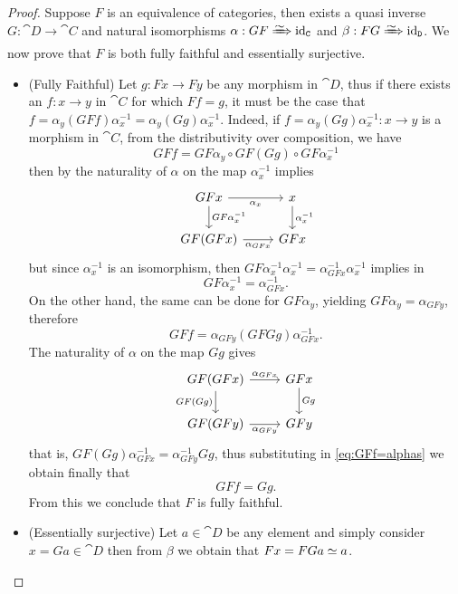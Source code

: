 \begin{proof}
Suppose \(F\) is an equivalence of categories, then exists a quasi inverse
\(G: \cat D \to \cat C\) and natural isomorphisms
\(\alpha: G F \isonat \Id_{\cat C}\) and \(\beta: F G \isonat \Id_{\cat D}\). We
now prove that \(F\) is both fully faithful and essentially surjective.

\begin{itemize}\setlength\itemsep{0em}
\item (Fully Faithful) Let \(g: Fx \to Fy\) be any morphism in \(\cat D\), thus
  if there exists an \(f: x \to y\) in \(\cat C\) for which \(F f = g\), it must
  be the case that
  \(f = \alpha_y (G F f) \alpha_x^{-1} = \alpha_y (G g) \alpha_x^{-1}\). Indeed,
  if \(f = \alpha_y (G g) \alpha_x^{-1}: x \to y\) is a morphism in \(\cat C\),
  from the distributivity over composition, we have
  \[
  G F f = G F \alpha_y \circ G F (G g) \circ G F \alpha_x^{-1}
  \]
  then by the naturality of \(\alpha\) on the map \(\alpha_x^{-1}\) implies
  \[
  \begin{tikzcd}
  G F x \ar[d, "G F \alpha_x^{-1}"] \ar[r, "\alpha_x"']
  & x \ar[d, "\alpha_x^{-1}"] \\
  G F (G F x) \ar[r, "\alpha_{G F x}"'] & G F x
  \end{tikzcd}
  \]
  but since \(\alpha_x^{-1}\) is an isomorphism, then
  \(G F \alpha_x^{-1} \alpha_x^{-1} = \alpha_{G F x}^{-1} \alpha_x^{-1}\)
  implies in
  \[
  G F \alpha_x^{-1} = \alpha_{G F x}^{-1}.
  \]
  On the other hand, the same can be done for \(G F \alpha_y\), yielding
  \(G F \alpha_y = \alpha_{G F y}\), therefore
  \begin{equation}\label{eq:GFf=alphas}
  G F f = \alpha_{G F y} (G F G g) \alpha_{G F x}^{-1}.
  \end{equation}
  The naturality of \(\alpha\) on the map \(G g\) gives
  \[
  \begin{tikzcd}
  G F (G F x) \ar[r, "\alpha_{G F x}"] \ar[d, "G F (G g)"']
  & G F x \ar[d, "G g"] \\
  G F (G F y) \ar[r, "\alpha_{G F y}"'] & G F y
  \end{tikzcd}
  \]
  that is, \(G F (G g) \alpha_{G F x}^{-1} = \alpha_{G F y}^{-1} G g\), thus
  substituting in \cref{eq:GFf=alphas} we obtain finally that
  \[
  G F f = G g.
  \]
  From this we conclude that \(F\) is fully faithful.

\item (Essentially surjective) Let \(a \in \cat D\) be any element and simply
  consider \(x = G a \in \cat D\) then from \(\beta\) we obtain that
  \(Fx = F G a \simeq a\).
\end{itemize}


\end{proof}
